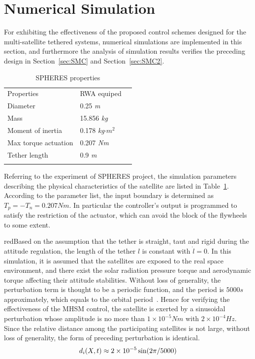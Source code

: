 \section{Numerical Simulation}\label{sec:sm}
For exhibiting the effectiveness of the proposed control schemes designed for the multi-satellite tethered systems, numerical simulations are implemented in this section, and furthermore the analysis of simulation results verifies the preceding design in Section~\ref{sec:SMC} and Section~\ref{sec:SMC2}.\par
\begin{table}
\caption{SPHERES properties}\label{ta:properites}
\label{tab:1}       %
\begin{tabular}{lll}
\hline\noalign{\smallskip}
Properties              &RWA equiped\\
\noalign{\smallskip}\hline\noalign{\smallskip}
Diameter   &0.25 \textit{m}\\
Mass       &15.856 \textit{kg}\\
Moment of inertia        &0.178 \textit{kg}$\cdot m^2$\\
Max torque actuation   &0.207 \textit{Nm}\\
Tether length &0.9 \textit{m}\\
\noalign{\smallskip}\hline
\end{tabular}
\end{table}
Referring to the experiment of SPHERES project, the simulation parameters describing the physical characteristics of the satellite are listed in Table~\ref{tab:1}. According to the parameter list, the input boundary is determined as $T_p = -T_n = 0.207Nm$. In particular the controller's output is programmed to satisfy the restriction of the actuator, which can avoid the block of the flywheels to some extent. \begin{color}{red}Based on the assumption that the tether is straight, taut and rigid during the attitude regulation, the length of the tether $l$ is constant with $\dot l =0$. In this simulation, it is assumed that the satellites are exposed to the real space environment, and there exist the solar radiation pressure torque and aerodynamic torque affecting their attitude stabilities. Without loss of generality, the perturbation term is thought to be a periodic function, and the period is $5000s$ approximately, which equals to the orbital period~\cite{inamori2015magnetic,liu2013calculation}. Hence for verifying the effectiveness of the MHSM control, the satellite is exerted by a sinusoidal perturbation whose amplitude is no more than $1\times 10^{-5}Nm$ with $2\times 10^{-4}Hz$. Since the relative distance among the participating satellites is not large, without loss of generality, the form of preceding perturbation is identical.
\begin{align}
d_i(X,t) \approx 2\times 10^{-5}\sin(2\pi/5000)\notag
\end{align}
\end{color}
